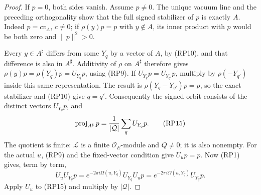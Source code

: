 \begin{proof}
If \(p=0\), both sides vanish. Assume \(p\ne0\).
The unique vacuum line and the preceding orthogonality show that
the full signed stabilizer of \(p\) is exactly \(A\).
Indeed \(p=cv_A\), \(c\ne0\); if \(\rho(y)p=p\) with \(y\notin A\),
its inner product with \(p\) would be both zero and
\(\|p\|^2>0\).

Every \(y\in A^\sharp\) differs from some \(Y_q\) by a vector
of \(A\), by (RP10), and that difference is also in \(A^\sharp\).
Additivity of \(\rho\) on \(A^\sharp\) therefore gives
\(\rho(y)p=\rho(Y_q)p=U_{Y_q}p\), using (RP9).
If \(U_{Y_q}p=U_{Y_{q'}}p\), multiply by
\(\rho(-Y_{q'})\) inside this same representation.
The result is \(\rho(Y_q-Y_{q'})p=p\), so the exact stabilizer
and (RP10) give \(q=q'\).
Consequently the signed orbit consists of the distinct vectors
\(U_{Y_q}p\), and
\[
                 \operatorname{proj}_{A^\sharp}p
                         ={1\over|\mathcal Q|}
                                     \sum_q U_{Y_q}p.     \tag{RP15}
\]
The quotient is finite: \(\mathcal L\) is a finite
\(\mathcal O_E\)-module and \(Q\ne0\); it is also nonempty.
For the actual \(u\), (RP9) and the fixed-vector condition give
\(U_up=p\). Now (RP1) gives, term by term,
\[
 U_uU_{Y_q}p=e^{-2\pi i\Omega(u,Y_q)}U_{Y_q}U_up
                     =e^{-2\pi i\Omega(u,Y_q)}U_{Y_q}p .
\]
Apply \(U_u\) to (RP15) and multiply by \(|\mathcal Q|\).
\end{proof}

